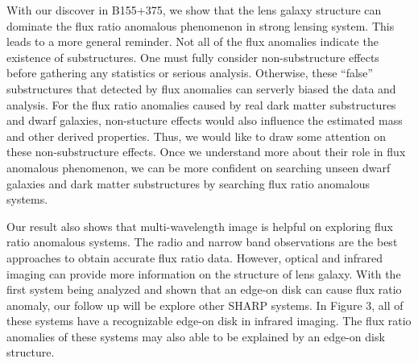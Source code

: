 \documentclass[manuscript]{emulateapj}
\begin{document}
With our discover in B155+375, we show that the lens galaxy structure can dominate the flux ratio anomalous phenomenon in strong lensing system. This leads to a more general reminder. Not all of the flux anomalies indicate the existence of substructures. One must fully consider non-substructure effects before gathering any statistics or serious analysis. Otherwise, these ``false'' substructures that detected by flux anomalies can serverly biased the data and analysis. For the flux ratio anomalies caused by real dark matter substructures and dwarf galaxies, non-stucture effects would also influence the estimated mass and other derived properties. Thus, we would like to draw some attention on these non-substructure effects. Once we understand more about their role in flux anomalous phenomenon, we can be more confident on searching unseen dwarf galaxies and dark matter substructures by searching flux ratio anomalous systems.

Our result also shows that multi-wavelength image is helpful on exploring flux ratio anomalous systems. The radio and narrow band observations are the best approaches to obtain accurate flux ratio data. However, optical and infrared imaging can provide more information on the structure of lens galaxy. With the first system being analyzed and shown that an edge-on disk can cause flux ratio anomaly, our follow up will be explore other SHARP systems. In Figure 3, all of these systems have a recognizable edge-on disk in infrared imaging. The flux ratio anomalies of these systems may also able to be explained by an edge-on disk structure.\\
 







\end{document}
